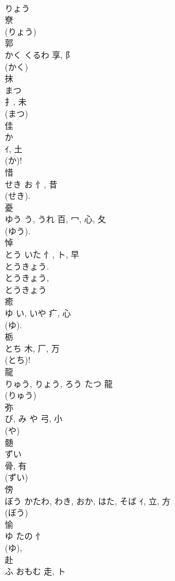 \documentclass[8pt]{extreport}
\begin{document}
\begin{CJK}{UTF8}{min}
\\	りょう	
\\	尞		
\\	(りょう) 
\\	郭	
\\	かく	くるわ	享, 阝	
\\	(かく) 
\\	抹	
\\	まつ	
\\	扌, 未	
\\	(まつ) 
\\	佳	
\\	か	
\\	ｲ, 土	
\\	(か)! 
\\	惜	
\\	せき	お	忄, 昔	
\\	(せき). 
\\	憂	
\\	ゆう	う, うれ	百, 冖, 心, 夂	
\\	(ゆう). 
\\	悼	
\\	とう	いた	忄, ト, 早	
\\	とうきょう. 
\\	とうきょう, 
\\	とうきょう 
\\	癒	
\\	ゆ	い, いや	疒, 心		
\\	(ゆ). 
\\	栃	
\\	とち	木, 厂, 万	
\\	(とち)! 
\\	龍	
\\	りゅう, りょう, ろう	たつ	龍	
\\	(りゅう) 
\\	弥	
\\	び, み	や	弓, 小		
\\	(や) 
\\	髄	
\\	ずい	
\\	骨, 有		
\\	(ずい) 
\\	傍	
\\	ぼう	かたわ, わき, おか, はた, そば	ｲ, 立, 方	
\\	(ぼう) 
\\	愉	
\\	ゆ	たの	忄		
\\	(ゆ), 
\\	赴	
\\	ふ	おもむ	走, ト	

\end{CJK}
\end{document}
